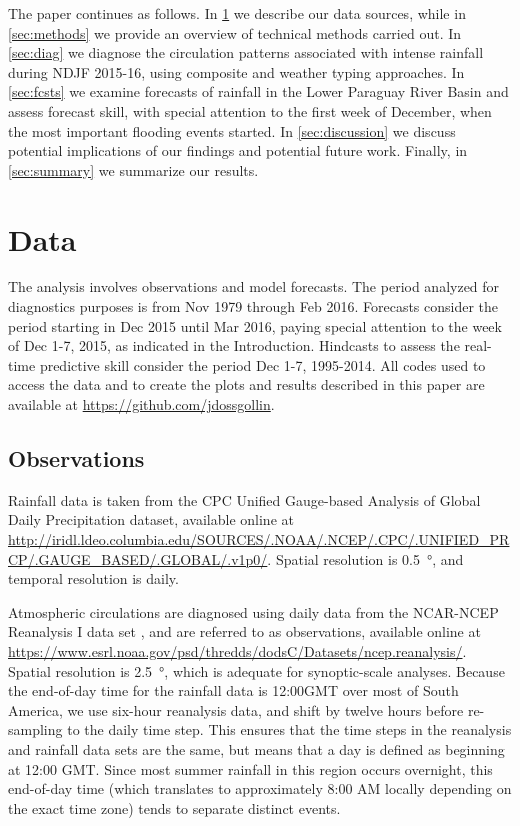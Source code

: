 \documentclass{ametsoc}
\begin{document}
The paper continues as follows.
In \cref{sec:data} we describe our data sources, while in \cref{sec:methods} we provide an overview of technical methods carried out.
In \cref{sec:diag} we diagnose the circulation patterns associated with intense rainfall during NDJF 2015-16, using composite and weather typing approaches.
In \cref{sec:fcsts} we examine forecasts of rainfall in the Lower Paraguay River Basin and assess forecast skill, with special attention to the first week of December, when the most important flooding events started.
In \cref{sec:discussion} we discuss potential implications of our findings and potential future work.
Finally, in \cref{sec:summary} we summarize our results.


\section{Data} \label{sec:data}

The analysis involves observations and model forecasts. The period analyzed for diagnostics purposes is from Nov 1979 through Feb 2016. Forecasts consider the period starting in Dec 2015 until Mar 2016, paying special attention to the week of Dec 1-7, 2015, as indicated in the Introduction. Hindcasts to assess the real-time predictive skill consider the period Dec 1-7, 1995-2014. All codes used to access the data and to create the plots and results described in this paper are available at \url{https://github.com/jdossgollin}.


\subsection{Observations}
Rainfall data is taken from the CPC Unified Gauge-based Analysis of Global Daily Precipitation dataset, available online at \url{http://iridl.ldeo.columbia.edu/SOURCES/.NOAA/.NCEP/.CPC/.UNIFIED_PRCP/.GAUGE_BASED/.GLOBAL/.v1p0/}.
Spatial resolution is \SI{0.5}{\degree}, and temporal resolution is daily.

Atmospheric circulations are diagnosed using daily data from the NCAR-NCEP Reanalysis I data set \citep{Kalnay1996}, and are referred to as observations, available online at \url{https://www.esrl.noaa.gov/psd/thredds/dodsC/Datasets/ncep.reanalysis/}.
Spatial resolution is \SI{2.5}{\degree}, which is adequate for synoptic-scale analyses.
Because the end-of-day time for the rainfall data is 12:00GMT over most of South America, we use six-hour reanalysis data, and shift by twelve hours before re-sampling to the daily time step.
This ensures that the time steps in the reanalysis and rainfall data sets are the same, but means that a day is defined as beginning at 12:00 GMT.
Since most summer rainfall in this region occurs overnight, this end-of-day time (which translates to approximately 8:00 AM locally depending on the exact time zone) tends to separate distinct events.
\end{document}
